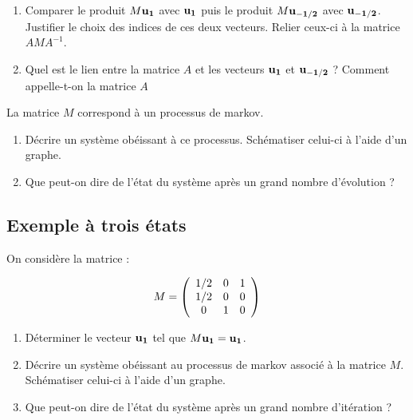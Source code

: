 \begin{enumerate}
  \setcounter{enumi}{\thenumero}
  \item Comparer le produit $M{\bf u_1}$ avec ${\bf u_1}$ puis le produit $M{\bf u_{-1/2}}$ avec ${\bf u_{-1/2}}$. Justifier le choix des indices de ces deux vecteurs. Relier ceux-ci à la matrice $AMA^{-1}$.
  \item Quel est le lien entre la matrice $A$ et les vecteurs ${\bf u_1}$ et ${\bf u_{-1/2}}$ ? Comment appelle-t-on la matrice $A$
\setcounter{numero}{\theenumi}\end{enumerate}

La matrice $M$ correspond à un processus de markov.

\begin{enumerate}
  \setcounter{enumi}{\thenumero}
  \item Décrire un système obéissant à ce processus. Schématiser celui-ci à l'aide d'un graphe.
  \item Que peut-on dire de l'état du système après un grand nombre d'évolution ?
\setcounter{numero}{\theenumi}\end{enumerate}

\subsection{Exemple à trois états}
On considère la matrice :

\[ M = \left( \begin{array}{ c c c } 1/2 & 0 & 1 \\ 1/2 & 0 & 0 \\ 0 & 1 & 0 \end{array} \right) \]

\begin{enumerate}
  \item Déterminer le vecteur ${\bf u_1}$ tel que $M{\bf u_1}={\bf u_1}$.
  \item Décrire un système obéissant au processus de markov associé à la matrice $M$. Schématiser celui-ci à l'aide d'un graphe.
  \item Que peut-on dire de l'état du système après un grand nombre d'itération ?
\setcounter{numero}{\theenumi}\end{enumerate}

